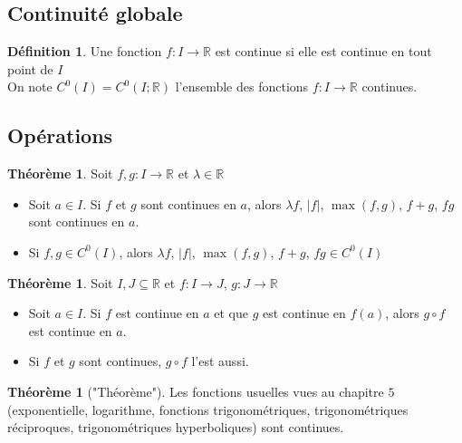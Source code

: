 \documentclass[10pt,a4paper]{article}
\theoremstyle{definition}
\newtheorem{theorem}[proposition]{Théorème}
\newtheorem{definition}[proposition]{Définition}
\begin{document}
\subsection{Continuité globale}
\begin{definition}
Une fonction $f: I \to \mathbb{R}$ est continue si elle est continue en tout point de $I$ \\
On note $C^0(I) = C^0(I; \mathbb{R})$ l'ensemble des fonctions $f: I \to \mathbb{R}$ continues.
\end{definition}

\subsection{Opérations}
\begin{theorem}
Soit $f, g: I \to \mathbb{R}$ et $\lambda \in \mathbb{R}$
\begin{itemize}
\item Soit $a \in I$. Si $f$ et $g$ sont continues en $a$, alors $\lambda f$, $|f|$, $\max(f, g)$, $f + g$, $f g$ sont continues en $a$.
\item Si $f, g \in C^0(I)$, alors $\lambda f$, $|f|$, $\max(f, g)$, $f + g$, $f g \in C^0(I)$
\end{itemize}
\end{theorem}
\begin{theorem}
Soit $I, J \subseteq \mathbb{R}$ et $f: I \to J$, $g: J \to \mathbb{R}$
\begin{itemize}
\item Soit $a \in I$. Si $f$ est continue en $a$ et que $g$ est continue en $f(a)$, alors $g \circ f$ est continue en $a$.
\item Si $f$ et $g$ sont continues, $g \circ f$ l'est aussi.
\end{itemize}
\end{theorem}
\begin{theorem}["Théorème"]
Les fonctions usuelles vues au chapitre $5$ (exponentielle, logarithme, fonctions trigonométriques, trigonométriques réciproques, trigonométriques hyperboliques) sont continues.
\end{theorem}
\end{document}
